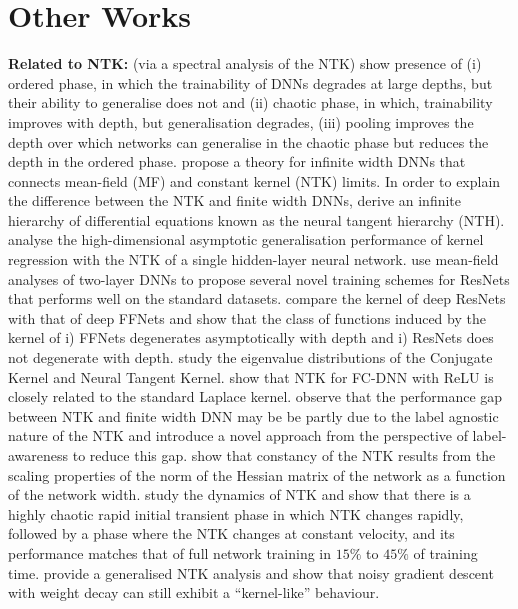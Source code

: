 \section{Other Works}

\textbf{Related to NTK:} \cite{disentangling} (via a spectral analysis of the NTK) show presence of (i) ordered phase, in which the trainability of DNNs degrades at large depths, but their ability to generalise does not and (ii) chaotic phase, in which, trainability improves with depth, but generalisation degrades,  (iii)  pooling  improves the depth over which networks can generalise in the chaotic phase but reduces the depth in the ordered phase. \cite{scaling}  propose a theory for infinite width DNNs that connects  mean-field (MF) and constant kernel (NTK) limits. In order to explain the difference between the NTK and finite width DNNs, \cite{nth} derive an infinite hierarchy of differential equations known as the neural tangent hierarchy (NTH). \cite{ntkregression} analyse the high-dimensional asymptotic generalisation performance of kernel regression with the NTK of a single hidden-layer neural network. \cite{meanres} use mean-field analyses of two-layer DNNs to propose several novel training schemes for ResNets that performs well on the standard datasets. \cite{deepres} compare the kernel of deep ResNets with that of deep FFNets and show that the class of functions induced by the kernel of i) FFNets degenerates asymptotically with depth and i) ResNets does not degenerate with depth. \cite{spectra} study the eigenvalue distributions of the Conjugate Kernel and Neural Tangent Kernel. \cite{laplace}  show that NTK for FC-DNN with ReLU  is closely related to the standard Laplace kernel. \cite{label}  observe that the performance gap between NTK and finite width DNN may be be partly due to the label agnostic nature of the NTK and introduce a novel approach from the perspective of label-awareness to reduce this gap. \cite{belkin} show that constancy of the NTK results from the scaling properties of the norm of the Hessian matrix of the network as a function of the network width. \cite{loss} study the dynamics of NTK and show that there is a highly chaotic rapid initial transient phase in which NTK changes rapidly, followed by a phase where the NTK changes at constant velocity, and its performance matches that of full network training in $15\%$ to $45\%$ of training time. \cite{genntk} provide a generalised NTK analysis and show that noisy gradient descent with weight decay can still exhibit a “kernel-like” behaviour. 

